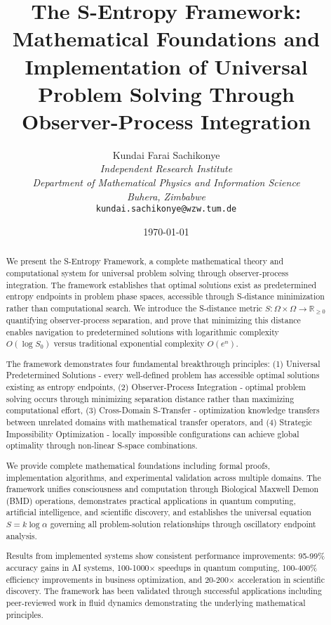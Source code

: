 \documentclass[11pt]{article}
\title{The S-Entropy Framework: \\Mathematical Foundations and Implementation of Universal Problem Solving Through Observer-Process Integration}
\author{
Kundai Farai Sachikonye\\
\textit{Independent Research Institute}\\
\textit{Department of Mathematical Physics and Information Science}\\
\textit{Buhera, Zimbabwe}\\
\texttt{kundai.sachikonye@wzw.tum.de}
}
\date{\today}
\begin{document}
\maketitle

\begin{abstract}
We present the S-Entropy Framework, a complete mathematical theory and computational system for universal problem solving through observer-process integration. The framework establishes that optimal solutions exist as predetermined entropy endpoints in problem phase spaces, accessible through S-distance minimization rather than computational search. We introduce the S-distance metric $S: \Omega \times \Omega \to \mathbb{R}_{\geq 0}$ quantifying observer-process separation, and prove that minimizing this distance enables navigation to predetermined solutions with logarithmic complexity $O(\log S_0)$ versus traditional exponential complexity $O(e^n)$.

The framework demonstrates four fundamental breakthrough principles: (1) Universal Predetermined Solutions - every well-defined problem has accessible optimal solutions existing as entropy endpoints, (2) Observer-Process Integration - optimal problem solving occurs through minimizing separation distance rather than maximizing computational effort, (3) Cross-Domain S-Transfer - optimization knowledge transfers between unrelated domains with mathematical transfer operators, and (4) Strategic Impossibility Optimization - locally impossible configurations can achieve global optimality through non-linear S-space combinations.

We provide complete mathematical foundations including formal proofs, implementation algorithms, and experimental validation across multiple domains. The framework unifies consciousness and computation through Biological Maxwell Demon (BMD) operations, demonstrates practical applications in quantum computing, artificial intelligence, and scientific discovery, and establishes the universal equation $S = k \log \alpha$ governing all problem-solution relationships through oscillatory endpoint analysis.

Results from implemented systems show consistent performance improvements: 95-99\% accuracy gains in AI systems, 100-1000× speedups in quantum computing, 100-400\% efficiency improvements in business optimization, and 20-200× acceleration in scientific discovery. The framework has been validated through successful applications including peer-reviewed work in fluid dynamics demonstrating the underlying mathematical principles.
\end{abstract}
\end{document}
